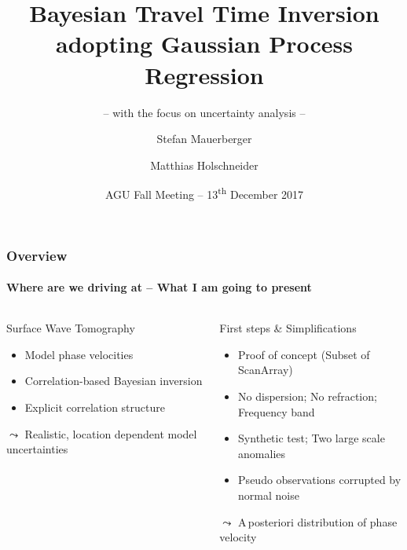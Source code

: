 \documentclass[aspectratio=169, t, 10pt]{beamer}
\title[Correlation based travel time inversion]{Bayesian Travel Time Inversion adopting Gaussian Process Regression}
\subtitle{-- with the focus on uncertainty analysis --}
\author[\tt mauerber@uni-potsdam.de]{Stefan Mauerberger \and Matthias Holschneider}
\institute[Math@UP]{University Potsdam, Institute of Mathematics}
\date[AGU~2017]{AGU Fall Meeting -- 13\textsuperscript{th} December 2017}
\begin{document}



\begin{frame}
    \frametitle{Overview}
    \framesubtitle{Where are we driving at -- What I am going to present}

\begin{columns}%
%
    \vspace{-4mm}
    \begin{block}{Surface Wave Tomography}
        \begin{itemize}
            \item Model phase velocities
            \item Correlation-based Bayesian inversion
            \item Explicit correlation structure
        \end{itemize}
        \hfill {\Large $\leadsto$} Realistic, location dependent model uncertainties ~
    \end{block}

    \begin{exampleblock}{First steps \& Simplifications}
        \begin{itemize}
            \item Proof of concept (Subset of ScanArray)
            \item No dispersion; No refraction; Frequency band
            \item Synthetic test; Two large scale anomalies
            \item Pseudo observations corrupted by normal noise
        \end{itemize}
        \hfill {\Large $\leadsto$} A\,posteriori distribution of phase velocity ~
    \end{exampleblock}


    \vspace{-10mm}
    
\end{columns}

\end{frame}
\end{document}
